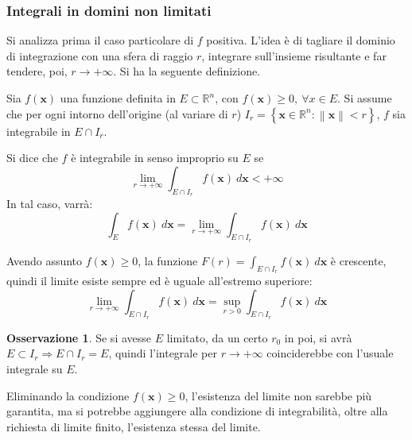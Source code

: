 \documentclass[11pt, a4paper]{scrartcl}
\theoremstyle{definition}
\numberwithin{esempio}{section}
\theoremstyle{definition}
\newtheorem{obs}{Osservazione}
\numberwithin{obs}{section}
\numberwithin{nota}{section}
\numberwithin{equation}{subsection}
\begin{document}
\subsubsection{Integrali in domini non limitati}
Si analizza prima il caso particolare di $f$ positiva. 
L'idea \`e di tagliare il dominio di integrazione con una sfera di raggio $r$, integrare sull'insieme risultante e far tendere, poi, $r\to +\infty$. Si ha la seguente definizione.
\begin{definizione}
	{}{}
	Sia $f(\mathbf{x} )$ una funzione definita in $E \subset \mathbb{R}^n$, con $f(\mathbf{x} ) \ge 0, \ \forall x \in E$.
	Si assume che per ogni intorno dell'origine (al variare di $r$) $ I_r = \left\{ \mathbf{x}  \in \mathbb{R}^n : \left\lVert \mathbf{x}  \right\rVert < r\right\} $, $f$ sia integrabile in $E \cap I_r$.

	Si dice che $f$ \`e integrabile in senso improprio su $E$ se
	\[
	\lim_{r \to +\infty} \int_{E\cap I_r} f(\mathbf{x} ) \ d\mathbf{x}  < +\infty
	\] 
	In tal caso, varr\`a:
	\begin{equation}
		\int_{E}  f(\mathbf{x} ) \ d\mathbf{x} =  \lim_{r \to +\infty} \int_{E\cap I_r} f(\mathbf{x} ) \ d\mathbf{x} 
	\end{equation}
\end{definizione}
\noindent Avendo assunto $f(\mathbf{x} )\ge 0$, la funzione $F(r) = \int_{E\cap I_r} f(\mathbf{x} ) \ d\mathbf{x} $ \`e crescente, quindi il limite esiste sempre ed \`e uguale all'estremo superiore:
\[
\lim_{r \to +\infty} \int_{E \cap I_r} f(\mathbf{x} ) \ d\mathbf{x} = \sup_{r > 0} \int_{E\cap I_r} f(\mathbf{x} ) \ d\mathbf{x} 
\] 
\begin{obs}
	Se si avesse $E$ limitato, da un certo $r_0$ in poi, si avr\`a $E \subset  I_r\Rightarrow E\cap I_r = E$, quindi l'integrale per $r\to +\infty$ coinciderebbe con l'usuale integrale su $E$.
\end{obs}
\noindent Eliminando la condizione $f(\mathbf{x} )\ge 0$, l'esistenza del limite non sarebbe pi\`u garantita, ma si potrebbe aggiungere alla condizione di integrabilit\`a, oltre alla richiesta di limite finito, l'esistenza stessa del limite.
\end{document}
